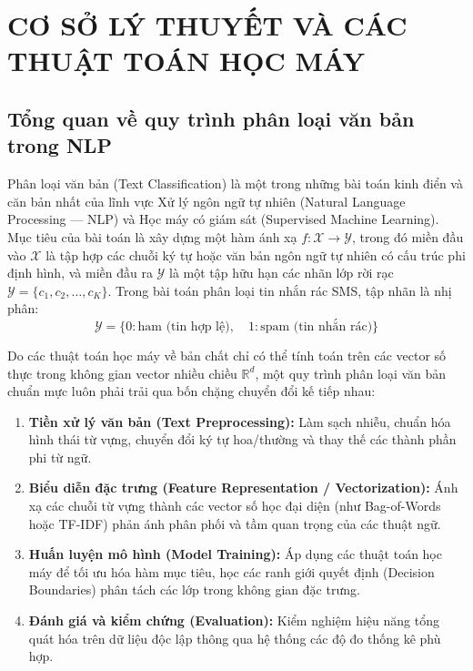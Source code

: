 \chapter{CƠ SỞ LÝ THUYẾT VÀ CÁC THUẬT TOÁN HỌC MÁY}
\label{chap:chuong2}

\section{Tổng quan về quy trình phân loại văn bản trong NLP}
\label{sec:quy-trinh-nlp}

Phân loại văn bản (Text Classification) là một trong những bài toán kinh điển và căn bản nhất của lĩnh vực Xử lý ngôn ngữ tự nhiên (Natural Language Processing --- NLP) và Học máy có giám sát (Supervised Machine Learning). Mục tiêu của bài toán là xây dựng một hàm ánh xạ $f: \mathcal{X} \rightarrow \mathcal{Y}$, trong đó miền đầu vào $\mathcal{X}$ là tập hợp các chuỗi ký tự hoặc văn bản ngôn ngữ tự nhiên có cấu trúc phi định hình, và miền đầu ra $\mathcal{Y}$ là một tập hữu hạn các nhãn lớp rời rạc $\mathcal{Y} = \{c_1, c_2, \dots, c_K\}$. Trong bài toán phân loại tin nhắn rác SMS, tập nhãn là nhị phân:
\begin{equation}
\mathcal{Y} = \{0: \text{ham (tin hợp lệ)}, \quad 1: \text{spam (tin nhắn rác)}\}
\end{equation}

Do các thuật toán học máy về bản chất chỉ có thể tính toán trên các vector số thực trong không gian vector nhiều chiều $\mathbb{R}^d$, một quy trình phân loại văn bản chuẩn mực luôn phải trải qua bốn chặng chuyển đổi kế tiếp nhau:
\begin{enumerate}
    \item \textbf{Tiền xử lý văn bản (Text Preprocessing):} Làm sạch nhiễu, chuẩn hóa hình thái từ vựng, chuyển đổi ký tự hoa/thường và thay thế các thành phần phi từ ngữ.
    \item \textbf{Biểu diễn đặc trưng (Feature Representation / Vectorization):} Ánh xạ các chuỗi từ vựng thành các vector số học đại diện (như Bag-of-Words hoặc TF-IDF) phản ánh phân phối và tầm quan trọng của các thuật ngữ.
    \item \textbf{Huấn luyện mô hình (Model Training):} Áp dụng các thuật toán học máy để tối ưu hóa hàm mục tiêu, học các ranh giới quyết định (Decision Boundaries) phân tách các lớp trong không gian đặc trưng.
    \item \textbf{Đánh giá và kiểm chứng (Evaluation):} Kiểm nghiệm hiệu năng tổng quát hóa trên dữ liệu độc lập thông qua hệ thống các độ đo thống kê phù hợp.
\end{enumerate}

